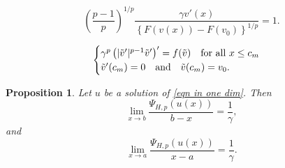 \documentclass[10pt,a4paper]{amsart}
\newtheorem{proposition}{Proposition}
\begin{document}
 \begin{equation}\label{eqn quotient}
     \left(\frac{p-1}{p}\right)^{1/p}\frac{\gamma v'(x)}{\left\{F\left(v(x)\right)-F(v_{0})\right\}^{1/p}}=1.
 \end{equation}

\begin{equation}\label{ODE2}
   \begin{cases}
     \gamma^{p}\left(|\Tilde{v}'|^{p-1}\Tilde{v}'\right)'=f(\Tilde{v})\quad \text{for all } x\leq c_{m}\\
     \Tilde{v}'(c_{m})=0 \quad \text{and} \quad \Tilde{v}(c_{m})=v_{0}.
 \end{cases} 
\end{equation}

\begin{proposition}
    Let $u$ be a solution of \eqref{eqn in one dim}. Then
    \begin{equation*}
       \lim_{x\to b}\frac{\Psi_{H,p}(u(x))}{b-x}= \frac{1}{\gamma},
    \end{equation*}
 and 
  \begin{equation*}
       \lim_{x\to a}\frac{\Psi_{H,p}(u(x))}{x-a}= \frac{1}{\gamma}.
    \end{equation*}
\end{proposition}
\end{document}
